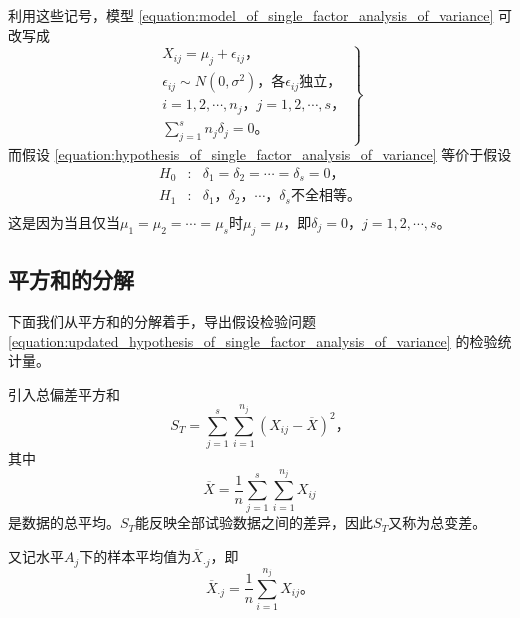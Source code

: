 利用这些记号，模型 \ref{equation:model_of_single_factor_analysis_of_variance} 可改写成
\begin{equation}\label{equation:updated_model_of_single_factor_analysis_of_variance}
	\left. 
	\begin{array}{l}
		X_{ij} = \mu_j + \epsilon_{ij} \text{，} \\
		\epsilon_{ij} \sim N\left( 0, \sigma^2\right) \text{，各} \epsilon_{ij} \text{独立，} \\
		i = 1, 2, \cdots, n_j \text{，} j = 1,2,\cdots, s \text{，} \\
		\displaystyle \sum_{j=1}^{s}n_{j}\delta_{j} = 0 \text{。}
	\end{array}
	\right\rbrace 
\end{equation}
而假设 \ref{equation:hypothesis_of_single_factor_analysis_of_variance} 等价于假设
\begin{equation}\label{equation:updated_hypothesis_of_single_factor_analysis_of_variance}
	\begin{array}{rcl}
		H_{0} & : & \delta_1 = \delta_2 = \cdots = \delta_s = 0 \text{，}\\
		H_{1} & : & \delta_1 \text{，} \delta_2 \text{，} \cdots \text{，} \delta_s \text{不全相等} \text{。}\\
	\end{array}
\end{equation}
这是因为当且仅当$ \mu_1 = \mu_2 = \cdots = \mu_s $时$ \mu_j = \mu $，即$ \delta_j = 0 $，$ j=1,2,\cdots, s $。

\subsection{平方和的分解}

下面我们从平方和的分解着手，导出假设检验问题 \ref{equation:updated_hypothesis_of_single_factor_analysis_of_variance} 的检验统计量。

引入总偏差平方和
\begin{equation}
	S_T = \sum_{j=1}^{s}\sum_{i=1}^{n_j}\left( X_{ij} - \overline{X}\right) ^2 \text{，}
\end{equation}
其中
\begin{equation}\label{eq:average_of_single_factor_analysis_of_variance}
	\overline{X} = \frac{1}{n}\sum_{j=1}^{s}\sum_{i=1}^{n_j}X_{ij}
\end{equation}
是数据的总平均。$ S_T $能反映全部试验数据之间的差异，因此$ S_T $又称为总变差。

又记水平$ A_j $下的样本平均值为$ \overline{X}_{\cdot j} $，即
\begin{equation}
	\overline{X}_{\cdot j} = \frac{1}{n}\sum_{i=1}^{n_j}X_{ij} \text{。}
\end{equation}

